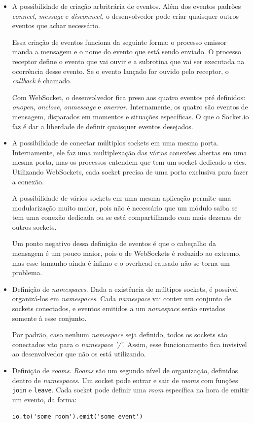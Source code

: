 \documentclass[a4paper,12pt]{article}
\newcommand{\code}[1]{\lstinline[mathescape=true, columns=fixed, basicstyle={\small\ttfamily}]{#1}}
\begin{document}
\begin{itemize}

\item A possibilidade de criação arbritrária de eventos. Além dos eventos padrões \emph{connect}, \emph{message} e \emph{disconnect}, o desenvolvedor pode criar quaisquer outros eventos que achar necessário.

Essa criação de eventos funciona da seguinte forma: o processo emissor manda a mensagem e o nome do evento que está sendo enviado. O processo receptor define o evento que vai ouvir e a subrotina que vai ser executada na ocorrência desse evento. Se o evento lançado for ouvido pelo receptor, o \emph{callback} é chamado.

Com WebSocket, o desenvolvedor fica preso aos quatro eventos pré definidos: \emph{onopen}, \emph{onclose}, \emph{onmessage} e \emph{onerror}. Internamente, os quatro são eventos de mensagem, disparados em momentos e situações específicas. O que o Socket.io faz é dar a liberdade de definir quaisquer eventos desejados.

\item A possibilidade de conectar múltiplos sockets em uma mesma porta. Internamente, ele faz uma multiplexação das várias conexões abertas em uma mesma porta, mas os processos entendem que tem um socket dedicado a eles. Utilizando WebSockets, cada socket precisa de uma porta exclusiva para fazer a conexão.

A possibilidade de vários sockets em uma mesma aplicação permite uma modularização muito maior, pois não é necessário que um módulo saiba se tem uma conexão dedicada ou se está compartilhando com mais dezenas de outros sockets.

Um ponto negativo dessa definição de eventos é que o cabeçalho da mensagem é um pouco maior, pois o de WebSockets é reduzido ao extremo, mas esse tamanho ainda é ínfimo e o overhead causado não se torna um problema.

\item Definição de \emph{namespaces}. Dada a existência de múltipos sockets, é possível organizá-los em \emph{namespaces}. Cada \emph{namespace}
vai conter um conjunto de sockets conectados, e eventos emitidos a um \emph{namespace} serão enviados somente à esse conjunto.

Por padrão, caso nenhum \emph{namespace} seja definido, todos os sockets são conectados vão para o \emph{namespace} \emph{'/'}. Assim, esse funcionamento fica invisível ao desenvolvedor que não os está utilizando.

\item Definição de \emph{rooms}. \emph{Rooms} são um segundo nível de organização, definidos dentro de \emph{namespaces}. Um socket pode entrar e sair de \emph{rooms} com funções \code{join} e \code{leave}. Cada socket pode definir uma \emph{room} específica na hora de emitir um evento, da forma:

\code{io.to('some room').emit('some event')}

\end{itemize}
\end{document}
